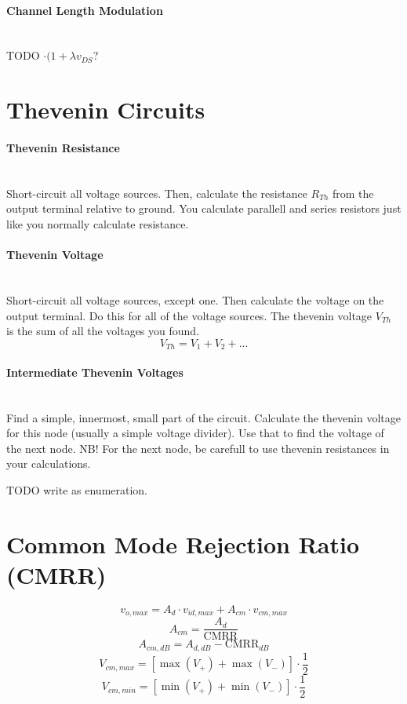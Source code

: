 \documentclass[twocolumn]{article}
\begin{document}
    \paragraph{Channel Length Modulation} \hfill \\
      TODO $\cdot (1 + \lambda v_{DS}$?
  \section{Thevenin Circuits}
    \paragraph{Thevenin Resistance} \hfill \\
      Short-circuit all voltage sources.
      Then, calculate the resistance $R_{Th}$ from the output terminal relative
      to ground.
      You calculate parallell and series resistors just like you normally
     calculate resistance.
    \paragraph{Thevenin Voltage} \hfill \\
      Short-circuit all voltage sources, except one.
      Then calculate the voltage on the output terminal.
      Do this for all of the voltage sources.
      The thevenin voltage $V_{Th}$ is the sum of all the voltages you found.
      $$V_{Th} = V_1 + V_2 + ...$$
    \paragraph{Intermediate Thevenin Voltages} \hfill \\
      Find a simple, innermost, small part of the circuit.
      Calculate the thevenin voltage for this node (usually a simple voltage
      divider).
      Use that to find the voltage of the next node.
      NB! For the next node, be carefull to use thevenin resistances in
      your calculations.

      TODO write as enumeration.
  \section{Common Mode Rejection Ratio (CMRR)}
    $$v_{o,max} = A_d \cdot v_{id,max} + A_{cm} \cdot v_{cm,max}$$
    $$A_{cm} = \frac{A_d}{\text{CMRR}}$$
    $$A_{cm,dB} = A_{d,dB} - \text{CMRR}_{dB}$$
    $$V_{cm,max} = \left[\max(V_+) + \max(V_-) \right] \cdot \frac{1}{2}$$
    $$V_{cm,min} = \left[\min(V_+) + \min(V_-) \right] \cdot \frac{1}{2}$$
\end{document}
